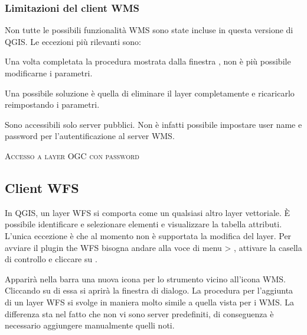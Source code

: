 \subsubsection{Limitazioni del client WMS}\label{sec:ogc-wms-limits}

Non tutte le possibili funzionalità WMS sono state incluse in questa versione di QGIS. Le eccezioni
più rilevanti sono:


Una volta completata la procedura mostrata dalla finestra
, non è più possibile
modificarne i parametri.

Una possibile soluzione è quella di eliminare il layer completamente e
ricaricarlo reimpostando i parametri.


Sono accessibili solo server pubblici. Non è infatti possibile impostare user
name e password per l'autentificazione al server WMS.

\begin{Tip}[ht]\caption{\textsc{Accesso a layer OGC con password}}
\end{Tip}


\subsection{Client WFS}

In QGIS, un layer WFS si comporta come un qualsiasi altro layer vettoriale.
È possibile identificare e selezionare elementi e visualizzare la tabella
attributi. L'unica eccezione è che al momento non è supportata la modifica del
layer. Per avviare il plugin the WFS bisogna andare alla voce di menu
 > , attivare la casella di controllo  e cliccare su . 

Apparirà nella barra una nuova icona per lo strumento
 vicino all'icona WMS.
Cliccando su di essa si aprirà la finestra di dialogo. La procedura per l'aggiunta di un layer
WFS si svolge in maniera molto simile a quella vista per i WMS. La differenza
sta nel fatto che non vi sono server predefiniti, di conseguenza è necessario
aggiungere manualmente quelli noti.

